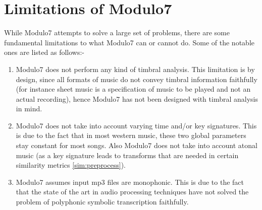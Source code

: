 \section{Limitations of Modulo7}  \label{limitations}

\noindent While Modulo7 attempts to solve a large set of problems, there are some fundamental limitations to what Modulo7 can or cannot do. Some of the notable ones are listed as follows:-

\begin{enumerate}
\item Modulo7 does not perform any kind of timbral analysis. This limitation is by design, since all formats of music do not convey timbral information faithfully (for instance sheet music is a specification of music to be played and not an actual recording), hence Modulo7 has not been designed with timbral analysis in mind.
\item Modulo7 does not take into account varying time and/or key signatures. This is due to the fact that in most western music, these two global parameters stay constant for most songs. Also Modulo7 does not take into account atonal music (as a key signature leads to transforms that are needed in certain similarity metrics \ref{sim:preprocess}). 
\item Modulo7 assumes input mp3 files are monophonic. This is due to the fact that the state of the art in audio processing techniques have not solved the problem of polyphonic symbolic transcription faithfully. \cite{melextract}
\end{enumerate}

